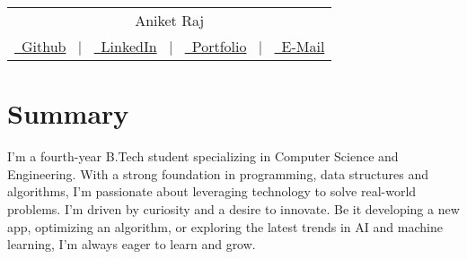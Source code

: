 \documentclass[a4paper,12pt]{article}
\begin{document}
\pagestyle{empty}



\begin{tabularx}{\linewidth}{@{} C @{}}
	\Huge{Aniket Raj}                                                                   \\[7.5pt]
	\href{https://github.com/theaniketraj}{\raisebox{-0.05\height}\faGithub\ Github} \ $|$ \
	\href{https://linkedin.com/in/theaniketraj}{\raisebox{-0.05\height}\faLinkedin\ LinkedIn} \ $|$ \
	\href{https://theaniketraj.netlify.app}{\raisebox{-0.05\height}\faGlobe \ Portfolio} \ $|$ \
	\href{mailto:theaniketraj@hotmail.com}{\raisebox{-0.05\height}\faEnvelope \ E-Mail} \\
\end{tabularx}


\section{Summary}
I’m a fourth-year B.Tech student specializing in Computer Science and Engineering. With a strong foundation in programming, data structures and algorithms, I’m passionate about leveraging technology to solve real-world problems. I’m driven by curiosity and a desire to innovate. Be it developing a new app, optimizing an algorithm, or exploring the latest trends in AI and machine learning, I’m always eager to learn and grow.

\end{document}

